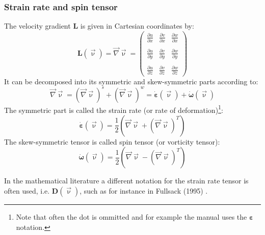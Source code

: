 \subsubsection{Strain rate and spin tensor} \label{ss:srst}

The velocity gradient ${\bm L}$ is given in Cartesian coordinates by:
\begin{equation}
{\bm L}(\vec\upnu)=
\vec\nabla\vec\upnu = 
\left(
\begin{array}{ccc}
\frac{\partial u}{\partial x} & \frac{\partial v}{\partial x} & \frac{\partial w}{\partial x} \\\\
\frac{\partial u}{\partial y} & \frac{\partial v}{\partial y} & \frac{\partial w}{\partial y} \\\\
\frac{\partial u}{\partial z} & \frac{\partial v}{\partial z} & \frac{\partial w}{\partial z} 
\end{array}
\right)
\end{equation}
It can be decomposed into its symmetric and skew-symmetric parts according to:
\begin{equation}
\vec\nabla\vec\upnu = (\vec\nabla\vec\upnu)^s + (\vec\nabla\vec\upnu)^w 
= \dot{\bm \varepsilon}(\vec \upnu) +  \dot{\bm \omega}(\vec \upnu)
\end{equation}
The symmetric part is called the strain rate (or rate of deformation)\footnote{Note that often the dot is ommitted and for example the \aspect manual uses the ${\bm \varepsilon}$ notation.}:
\begin{equation}
\dot{\bm \varepsilon}(\vec \upnu) = \frac{1}{2}\left( \vec\nabla\vec\upnu + (\vec\nabla\vec\upnu)^T \right)
\end{equation}
The skew-symmetric tensor is called spin tensor (or vorticity tensor):
\begin{equation}
\dot{\bm \omega}(\vec \upnu) = \frac{1}{2}\left( \vec\nabla\vec\upnu - (\vec\nabla\vec\upnu)^T \right)
\end{equation}

\begin{remark}
In the mathematical literature a different notation for the strain rate tensor is often used, i.e. 
${\bm D}(\vec \upnu)$, such as for instance in Fullsack (1995) \cite{full95}.
\end{remark}

